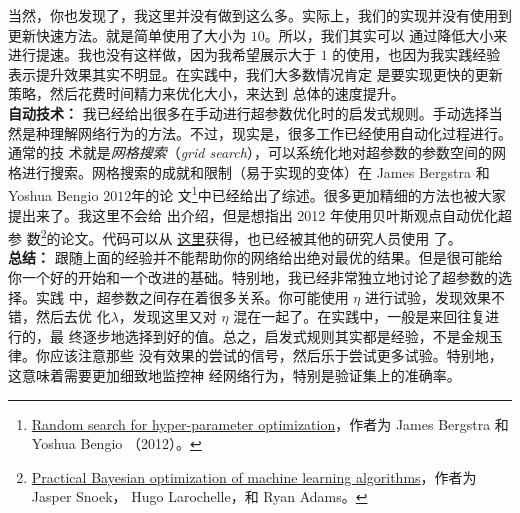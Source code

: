 当然，你也发现了，我这里并没有做到这么多。实际上，我们的实现并没有使用到
\minibatch{}更新快速方法。就是简单使用了\minibatch{}大小为 $10$。所以，我们其实可以
通过降低\minibatch{}大小来进行提速。我也没有这样做，因为我希望展示\minibatch{}大于
$1$ 的使用，也因为我实践经验表示提升效果其实不明显。在实践中，我们大多数情况肯定
是要实现更快的\minibatch{}更新策略，然后花费时间精力来优化\minibatch{}大小，来达到
总体的速度提升。\\

\textbf{自动技术：} 我已经给出很多在手动进行超参数优化时的启发式规则。手动选择当
然是种理解网络行为的方法。不过，现实是，很多工作已经使用自动化过程进行。通常的技
术就是\emph{网格搜索}（\emph{grid search}），可以系统化地对超参数的参数空间的网
格进行搜索。网格搜索的成就和限制（易于实现的变体）在 James Bergstra 和 Yoshua
Bengio $2012$年的论
文\footnote{\href{http://dl.acm.org/citation.cfm?id=2188395}{Random search for
    hyper-parameter optimization}，作者为 James Bergstra 和 Yoshua Bengio
  （2012）。}中已经给出了综述。很多更加精细的方法也被大家提出来了。我这里不会给
出介绍，但是想指出 2012 年使用贝叶斯观点自动优化超参
数\footnote{\href{http://papers.nips.cc/paper/4522-practical-bayesian-optimization-of-machine-learning-algorithms.pdf}{Practical
    Bayesian optimization of machine learning algorithms}，作者为 Jasper Snoek，
  Hugo Larochelle，和 Ryan Adams。}的论文。代码可以从%
\href{https://github.com/jaberg/hyperopt}{这里}获得，也已经被其他的研究人员使用
了。\\

\textbf{总结：} 跟随上面的经验并不能帮助你的网络给出绝对最优的结果。但是很可能给
你一个好的开始和一个改进的基础。特别地，我已经非常独立地讨论了超参数的选择。实践
中，超参数之间存在着很多关系。你可能使用 $\eta$ 进行试验，发现效果不错，然后去优
化$\lambda$，发现这里又对 $\eta$ 混在一起了。在实践中，一般是来回往复进行的，最
终逐步地选择到好的值。总之，启发式规则其实都是经验，不是金规玉律。你应该注意那些
没有效果的尝试的信号，然后乐于尝试更多试验。特别地，这意味着需要更加细致地监控神
经网络行为，特别是验证集上的准确率。

